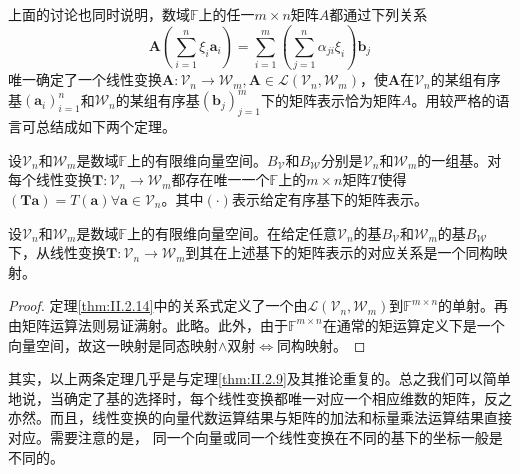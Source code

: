 \documentclass[main.tex]{subfiles}
\begin{document}
上面的讨论也同时说明，数域$\mathbb{F}$上的任一$m\times n$矩阵$A$都通过下列关系
\[
    \mathbf{A}\left(\sum_{i=1}^n\xi_i\mathbf{a}_i\right)=\sum_{i=1}^m\left(\sum_{j=1}^n\alpha_{ji}\xi_i\right)\mathbf{b}_j
\]
唯一确定了一个线性变换$\mathbf{A}:\mathcal{V}_n\rightarrow\mathcal{W}_m,\mathbf{A}\in\mathcal{L}\left(\mathcal{V}_n,\mathcal{W}_m\right)$，使$\mathbf{A}$在$\mathcal{V}_n$的某组有序基$\left(\mathbf{a}_i\right)_{i=1}^n$和$\mathcal{W}_n$的某组有序基$\left(\mathbf{b}_j\right)_{j=1}^m$下的矩阵表示恰为矩阵$A$。用较严格的语言可总结成如下两个定理。

\begin{theorem}\label{thm:II.2.14}
    设$\mathcal{V}_n$和$\mathcal{W}_m$是数域$\mathbb{F}$上的有限维向量空间。$B_\mathcal{V}$和$B_\mathcal{W}$分别是$\mathcal{V}_n$和$\mathcal{W}_m$的一组基。对每个线性变换$\mathbf{T}:\mathcal{V}_n\rightarrow\mathcal{W}_m$都存在唯一一个$\mathbb{F}$上的$m\times n$矩阵$T$使得$\left(\mathbf{Ta}\right)=T\left(\mathbf{a}\right)\forall\mathbf{a}\in\mathcal{V}_n$。其中$\left(\cdot\right)$表示给定有序基下的矩阵表示。
\end{theorem}

\begin{theorem}\label{thm:II.2.15}
    设$\mathcal{V}_n$和$\mathcal{W}_m$是数域$\mathbb{F}$上的有限维向量空间。在给定任意$\mathcal{V}_n$的基$B_\mathcal{V}$和$\mathcal{W}_m$的基$B_\mathcal{W}$下，从线性变换$\mathbf{T}:\mathcal{V}_n\rightarrow\mathcal{W}_m$到其在上述基下的矩阵表示的对应关系是一个同构映射。
\end{theorem}
\begin{proof}
    定理\ref{thm:II.2.14}中的关系式定义了一个由$\mathcal{L}\left(\mathcal{V}_n,\mathcal{W}_m\right)$到$\mathbb{F}^{m\times n}$的单射。再由矩阵运算法则易证满射。此略。此外，由于$\mathbb{F}^{m\times n}$在通常的矩运算定义下是一个向量空间，故这一映射是同态映射$\wedge$双射$\Leftrightarrow$同构映射。
\end{proof}

其实，以上两条定理几乎是与定理\ref{thm:II.2.9}及其推论重复的。总之我们可以简单地说，当确定了基的选择时，每个线性变换都唯一对应一个相应维数的矩阵，反之亦然。而且，线性变换的向量代数运算结果与矩阵的加法和标量乘法运算结果直接对应。需要注意的是， 同一个向量或同一个线性变换在不同的基下的坐标一般是不同的。
\end{document}
